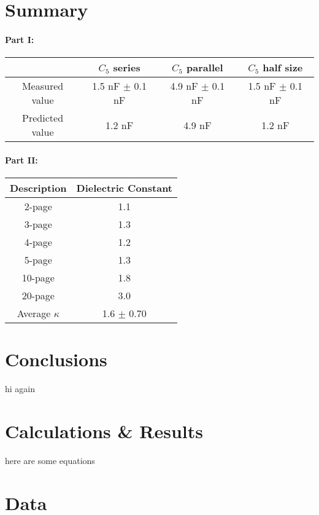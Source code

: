 \documentclass[11pt,letterpaper]{report}
\begin{document}

\pagebreak

\section*{Summary}
\paragraph{Part I:}
\begin{tabular}{ | c | c | c | c |}
\hline
 & $C_{5}$ series & $C_{5}$ parallel & $C_{5}$ half size \\
 \hline
Measured value & 1.5 nF $\pm$ 0.1 nF & 4.9 nF $\pm$ 0.1 nF & 1.5 nF $\pm$ 0.1 nF \\
Predicted value & 1.2 nF & 4.9 nF & 1.2 nF   \\

\hline
\end{tabular}

\paragraph{Part II:}
\begin{tabular}{ | c | c |}
\hline
Description & Dielectric Constant \\
\hline
2-page & 1.1 \\
3-page & 1.3 \\
4-page & 1.2 \\
5-page & 1.3 \\
10-page & 1.8 \\
20-page & 3.0 \\
\hline
Average $\kappa$ & 1.6 $\pm$ 0.70\\

\hline
\end{tabular}


\section*{Conclusions}
hi again

\section*{Calculations \& Results}
here are some equations

\section*{Data}
\end{document}
